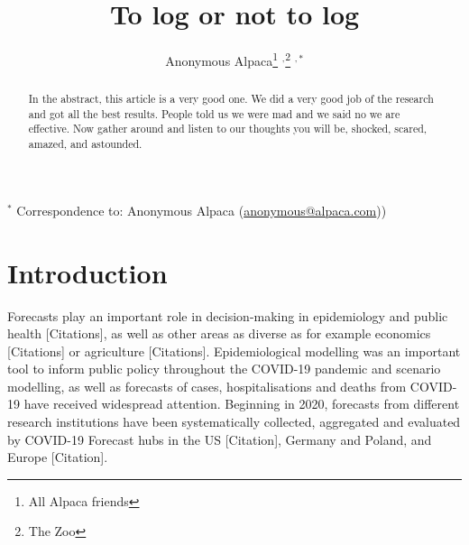\documentclass{article}
\begin{document}
\title{To log or not to log}
  \author{Anonymous Alpaca\thanks{All Alpaca friends} $^{,}$\thanks{The Zoo} $^{ , *}$}

\maketitle

\tableofcontents

\begin{abstract}
In the abstract, this article is a very good one. We did a very good job of the research and got all the best results. People told us we were mad and we said no we are effective. Now gather around and listen to our thoughts you will be, shocked, scared, amazed, and astounded.
\end{abstract}

\bigskip

{\footnotesize $^*$ Correspondence to: Anonymous Alpaca (\url{anonymous@alpaca.com}))}



\newpage


\section{Introduction}

Forecasts play an important role in decision-making in epidemiology and public health [Citations], as well as other areas as diverse as for example economics [Citations] or agriculture [Citations]. Epidemiological modelling was an important tool to inform public policy throughout the COVID-19 pandemic and scenario modelling, as well as forecasts of cases, hospitalisations and deaths from COVID-19 have received widespread attention. Beginning in 2020, forecasts from different research institutions have been systematically collected, aggregated and evaluated by COVID-19 Forecast hubs in the US [Citation], Germany and Poland, and Europe [Citation]. 
\end{document}
